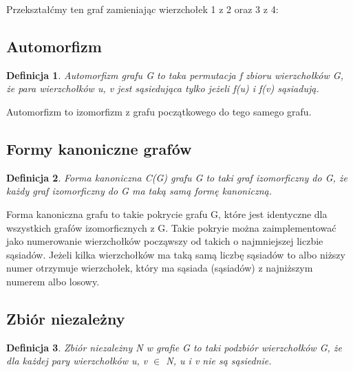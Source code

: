\documentclass[11pt]{article}
\newtheorem{definition}{Definicja}[section]
\begin{document}
  Przekształćmy ten graf zamieniając wierzchołek 1 z 2 oraz 3 z 4:


  \subsection{Automorfizm}

  \begin{definition}
    Automorfizm grafu G to taka permutacja f zbioru wierzchołków G, że para wierzchołków u, v jest sąsiedująca tylko jeżeli f(u) i f(v) sąsiadują. 
  \end{definition}
  Automorfizm to izomorfizm z grafu początkowego do tego samego grafu. 

  \subsection{Formy kanoniczne grafów}

  \begin{definition}
    Forma kanoniczna C(G) grafu G to taki graf izomorficzny do G, że każdy graf izomorficzny do G ma taką samą formę kanoniczną. 
  \end{definition}
  Forma kanoniczna grafu to takie pokrycie grafu G, 
  które jest identyczne dla wszystkich grafów izomorficznych z G. Takie pokryie można zaimplementować
   jako numerowanie wierzchołków począwszy od takich o najmniejszej liczbie sąsiadów. 
   Jeżeli kilka wierzchołków ma taką samą liczbę sąsiadów to albo niższy numer otrzymuje wierzchołek, 
   który ma sąsiada (sąsiadów) z najniższym numerem albo losowy. 

  \subsection{Zbiór niezależny}
  \begin{definition}
    Zbiór niezależny N w grafie G to taki podzbiór wierzchołków G, że dla każdej pary wierzchołków u, v $\in$ N, u i v nie są sąsiednie. 
  \end{definition}
  
\end{document}
